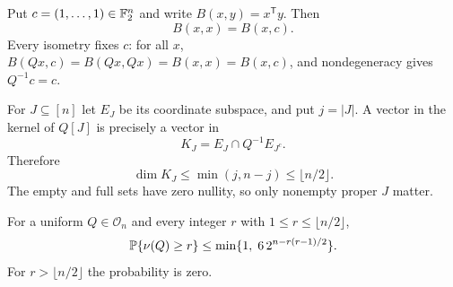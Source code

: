 Put $c=(1,\ldots,1)\in\mathbb F_2^n$ and write $B(x,y)=x^{\mathsf T}y$. Then
\[
 B(x,x)=B(x,c).
\]
Every isometry fixes $c$: for all $x$,
$B(Qx,c)=B(Qx,Qx)=B(x,x)=B(x,c)$, and nondegeneracy gives $Q^{-1}c=c$.

For $J\subseteq[n]$ let $E_J$ be its coordinate subspace, and put $j=|J|$. A vector in the kernel of $Q[J]$ is precisely a vector in
\begin{equation}\label{eq:kernel-intersection}
 K_J=E_J\cap Q^{-1}E_{J^c}.
\end{equation}
Therefore
\[
 \dim K_J\le\min(j,n-j)\le\lfloor n/2\rfloor.
\]
The empty and full sets have zero nullity, so only nonempty proper $J$ matter.

\begin{theorem}\label{thm:binary}
For a uniform $Q\in\mathcal O_n$ and every integer $r$ with
$1\le r\le\lfloor n/2\rfloor$,
\[
 \mathbb P\{\nu(Q)\ge r\}\le
 \min\{1,\;6\,2^{n-r(r-1)/2}\}.
\]
For $r>\lfloor n/2\rfloor$ the probability is zero.
\end{theorem}

